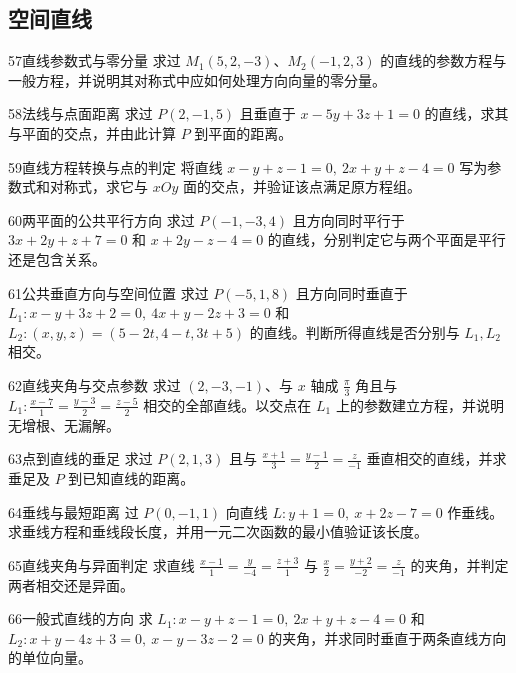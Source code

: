\subsection{空间直线}
\begin{exercise}{57}{直线参数式与零分量}
求过 $M_1(5,2,-3)$、$M_2(-1,2,3)$ 的直线的参数方程与一般方程，并说明其对称式中应如何处理方向向量的零分量。
\end{exercise}
\begin{exercise}{58}{法线与点面距离}
求过 $P(2,-1,5)$ 且垂直于 $x-5y+3z+1=0$ 的直线，求其与平面的交点，并由此计算 $P$ 到平面的距离。
\end{exercise}
\begin{exercise}{59}{直线方程转换与点的判定}
将直线 $x-y+z-1=0,\ 2x+y+z-4=0$ 写为参数式和对称式，求它与 $xOy$ 面的交点，并验证该点满足原方程组。
\end{exercise}
\begin{exercise}{60}{两平面的公共平行方向}
求过 $P(-1,-3,4)$ 且方向同时平行于 $3x+2y+z+7=0$ 和 $x+2y-z-4=0$ 的直线，分别判定它与两个平面是平行还是包含关系。
\end{exercise}
\begin{exercise}{61}{公共垂直方向与空间位置}
求过 $P(-5,1,8)$ 且方向同时垂直于 $L_1:x-y+3z+2=0,\ 4x+y-2z+3=0$ 和 $L_2:(x,y,z)=(5-2t,4-t,3t+5)$ 的直线。判断所得直线是否分别与 $L_1,L_2$ 相交。
\end{exercise}
\begin{exercise}{62}{直线夹角与交点参数}
求过 $(2,-3,-1)$、与 $x$ 轴成 $\frac\pi3$ 角且与 $L_1:\frac{x-7}{1}=\frac{y-3}{2}=\frac{z-5}{2}$ 相交的全部直线。以交点在 $L_1$ 上的参数建立方程，并说明无增根、无漏解。
\end{exercise}
\begin{exercise}{63}{点到直线的垂足}
求过 $P(2,1,3)$ 且与 $\frac{x+1}{3}=\frac{y-1}{2}=\frac z{-1}$ 垂直相交的直线，并求垂足及 $P$ 到已知直线的距离。
\end{exercise}
\begin{exercise}{64}{垂线与最短距离}
过 $P(0,-1,1)$ 向直线 $L:y+1=0,\ x+2z-7=0$ 作垂线。求垂线方程和垂线段长度，并用一元二次函数的最小值验证该长度。
\end{exercise}
\begin{exercise}{65}{直线夹角与异面判定}
求直线 $\frac{x-1}{1}=\frac y{-4}=\frac{z+3}{1}$ 与 $\frac x2=\frac{y+2}{-2}=\frac z{-1}$ 的夹角，并判定两者相交还是异面。
\end{exercise}
\begin{exercise}{66}{一般式直线的方向}
求 $L_1:x-y+z-1=0,\ 2x+y+z-4=0$ 和 $L_2:x+y-4z+3=0,\ x-y-3z-2=0$ 的夹角，并求同时垂直于两条直线方向的单位向量。
\end{exercise}
